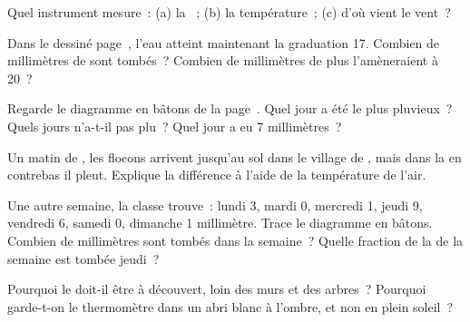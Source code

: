 \begin{exercise}[$\star$]\label{exo:g4:clouds-rain-snow:4}
Quel instrument mesure~: (a) la ~; (b) la température~; (c) d'où vient
le vent~?
\end{exercise}

\begin{exercise}[$\star$]\label{exo:g4:clouds-rain-snow:5}
Dans le  dessiné page~\pageref{fig:g4:clouds-rain-snow:gauge},
l'eau atteint maintenant la graduation 17. Combien de millimètres de 
sont tombés~? Combien de millimètres de plus l'amèneraient à 20~?
\end{exercise}

\begin{exercise}[$\star$]\label{exo:g4:clouds-rain-snow:6}
Regarde le diagramme en bâtons de la page~\pageref{fig:g4:clouds-rain-snow:bars}.
Quel jour a été le plus pluvieux~? Quels jours n'a-t-il pas plu~? Quel
jour a eu 7 millimètres~?
\end{exercise}

\begin{exercise}[$\star\star$]\label{exo:g4:clouds-rain-snow:7}
Un matin de , les flocons arrivent jusqu'au sol dans le village de
, mais dans la  en contrebas il pleut. Explique la
différence à l'aide de la température de l'air.
\end{exercise}

\begin{exercise}[$\star\star$]\label{exo:g4:clouds-rain-snow:8}
Une autre semaine, la classe trouve~: lundi 3, mardi 0, mercredi 1,
jeudi 9, vendredi 6, samedi 0, dimanche 1 millimètre. Trace le diagramme
en bâtons. Combien de millimètres sont tombés dans la semaine~? Quelle
fraction de la  de la semaine est tombée jeudi~?
\end{exercise}

\begin{exercise}[$\star\star$]\label{exo:g4:clouds-rain-snow:9}
Pourquoi le  doit-il être à découvert, loin des murs et des
arbres~? Pourquoi garde-t-on le thermomètre dans un abri blanc à l'ombre,
et non en plein soleil~?
\end{exercise}

